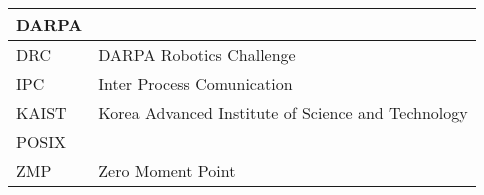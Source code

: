 \begin{tabular}{l | l}
\hline
DARPA  &  \\
\hline
DRC  & DARPA Robotics Challenge \\
\hline
IPC & Inter Process Comunication \\
\hline
KAIST & Korea Advanced Institute of Science and Technology \\
\hline
POSIX & \\
\hline 
ZMP & Zero Moment Point\\
\hline
\end{tabular}
